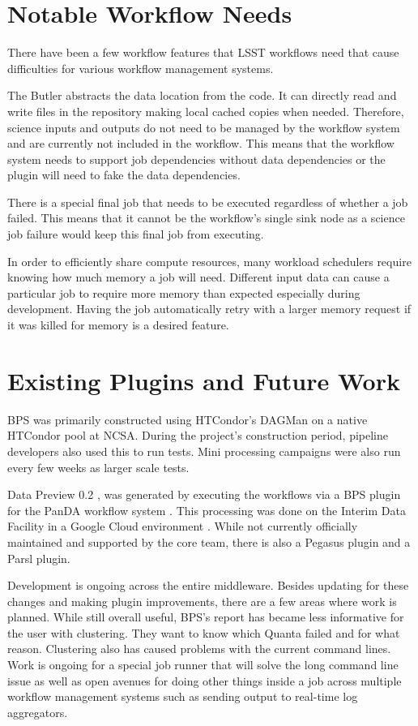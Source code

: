 \documentclass[11pt,twoside]{article}
\begin{document}
\section{Notable Workflow Needs}
There have been a few workflow features that LSST workflows need that
cause difficulties for various workflow management systems.

The Butler abstracts the data location from the code.  It can directly
read and write files in the repository making local cached copies when
needed.  Therefore, science inputs and outputs do not need to be managed
by the workflow system and are currently not included in the workflow.
This means that the workflow system needs to support job dependencies
without data dependencies or the plugin will need to fake the data
dependencies.

There is a special final job that needs to be executed regardless of
whether a job failed.  This means that it cannot be the workflow's
single sink node as a science job failure would keep this final job
from executing.

In order to efficiently share compute resources, many workload schedulers
require knowing how much memory a job will need.  Different input data can
cause a particular job to require more memory than expected especially
during development.  Having the job automatically retry with a larger
memory request if it was killed for memory is a desired feature.

\section{Existing Plugins and Future Work}
BPS was primarily constructed using HTCondor's \citep{10.1002/cpe.938}
DAGMan on a native HTCondor pool at NCSA.  During the project's
construction period, pipeline developers also used this to run tests.
Mini processing campaigns were also run every few weeks as larger
scale tests.

Data Preview 0.2 \citep[DP0.2;][]{RTN-039}, was generated by
executing the workflows via a BPS plugin for the PanDA workflow system
\citep{10.1088/1742-6596/331/7/072024}.  This processing was done on
the Interim Data Facility in a Google Cloud environment \citep{2021arXiv211115030O}.
While not currently officially maintained and supported by the core team,
there is also a Pegasus \citep{10.1016/j.future.2014.10.008} plugin and
a Parsl \citep{10.1145/3307681.3325400} plugin.

Development is ongoing across the entire middleware.  Besides updating
for these changes and making plugin improvements, there are a few areas
where work is planned.  While still overall useful, BPS's report has
became less informative for the user with clustering.  They want to know
which Quanta failed and for what reason.  Clustering also has caused
problems with the current command lines.  Work is ongoing for a special
job runner that will solve the long command line issue as well as open
avenues for doing other things inside a job across multiple workflow
management systems such as sending output to real-time log aggregators.
\end{document}
